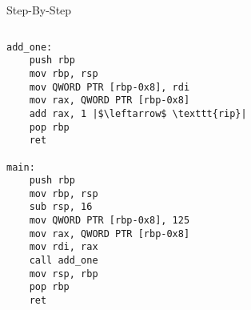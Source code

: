 \documentclass[hyphens,aspectratio=169]{beamer}
\begin{document}
\begin{frame}[fragile]{Step-By-Step}
    \begin{columns}
        \begin{column}{0.33\textwidth}
            \begin{verbatim}
add_one:
    push rbp
    mov rbp, rsp
    mov QWORD PTR [rbp-0x8], rdi
    mov rax, QWORD PTR [rbp-0x8]
    add rax, 1 |$\leftarrow$ \texttt{rip}|
    pop rbp
    ret

main:
    push rbp
    mov rbp, rsp
    sub rsp, 16
    mov QWORD PTR [rbp-0x8], 125
    mov rax, QWORD PTR [rbp-0x8]
    mov rdi, rax
    call add_one
    mov rsp, rbp
    pop rbp
    ret
            \end{verbatim}
        \end{column}
        \begin{column}{0.33\textwidth}
\end{column}
\end{columns}
\end{frame}
\end{document}
